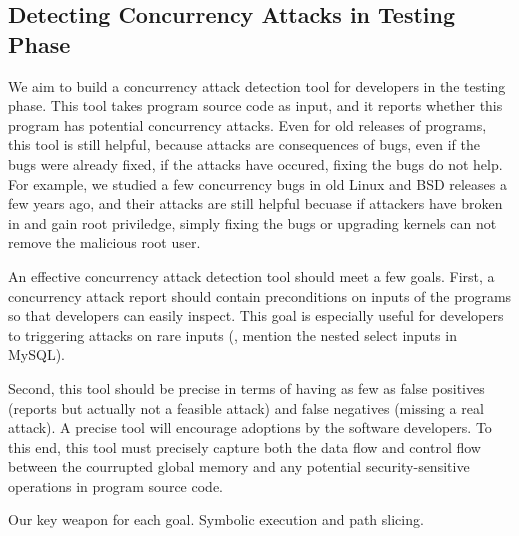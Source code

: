 





\subsection{Detecting Concurrency Attacks in Testing Phase}\label{sec:detect}

We aim to build a concurrency attack detection tool for developers in the 
testing phase. This tool takes program source code as input, and it reports 
whether this program has potential concurrency attacks. Even for old releases 
of programs, this tool is still helpful, because attacks are consequences of 
bugs, even if the bugs were already fixed, if the attacks have occured, fixing 
the bugs do not help. For example, we studied a few concurrency bugs in old 
Linux and BSD releases a few years ago, and their attacks are still helpful 
becuase if attackers have broken in and gain root priviledge, simply fixing the 
bugs or upgrading kernels can not remove the malicious root user.
 
An effective concurrency attack detection tool should meet a few goals. First, 
a concurrency attack report should contain preconditions on inputs of the 
programs so that developers can easily inspect. This goal is especially useful 
for developers to triggering attacks on rare inputs (\eg, mention the nested 
select inputs in MySQL).

Second, this tool should be precise in terms of having as few as false 
positives (reports but actually not a feasible attack) and false negatives 
(missing a real attack). A precise tool will encourage adoptions by the 
software developers. To this end, this tool must precisely capture both the 
data flow and control flow between the courrupted global memory and any 
potential security-sensitive operations in program source code. 

Our key weapon for each goal. Symbolic execution and path slicing.

